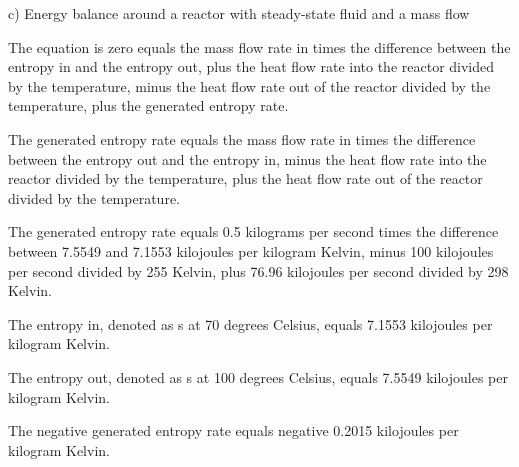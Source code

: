 c) Energy balance around a reactor with steady-state fluid and a mass flow

The equation is zero equals the mass flow rate in times the difference between the entropy in and the entropy out, plus the heat flow rate into the reactor divided by the temperature, minus the heat flow rate out of the reactor divided by the temperature, plus the generated entropy rate.

The generated entropy rate equals the mass flow rate in times the difference between the entropy out and the entropy in, minus the heat flow rate into the reactor divided by the temperature, plus the heat flow rate out of the reactor divided by the temperature.

The generated entropy rate equals 0.5 kilograms per second times the difference between 7.5549 and 7.1553 kilojoules per kilogram Kelvin, minus 100 kilojoules per second divided by 255 Kelvin, plus 76.96 kilojoules per second divided by 298 Kelvin.

The entropy in, denoted as s at 70 degrees Celsius, equals 7.1553 kilojoules per kilogram Kelvin.

The entropy out, denoted as s at 100 degrees Celsius, equals 7.5549 kilojoules per kilogram Kelvin.

The negative generated entropy rate equals negative 0.2015 kilojoules per kilogram Kelvin.